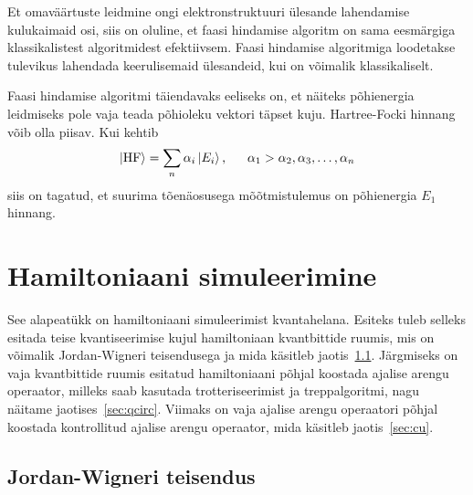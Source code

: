\documentclass[12pt]{report}
\def\ket#1{\left|#1\right>}
\begin{document}
Et omaväärtuste leidmine ongi elektronstruktuuri ülesande lahendamise kulukaimaid osi, siis on oluline, et faasi hindamise algoritm on sama eesmärgiga klassikalistest algoritmidest efektiivsem.
Faasi hindamise algoritmiga loodetakse tulevikus lahendada keerulisemaid ülesandeid, kui on võimalik klassikaliselt.

Faasi hindamise algoritmi täiendavaks eeliseks on, et näiteks põhienergia leidmiseks pole vaja teada põhioleku vektori täpset kuju.
Hartree-Focki hinnang võib olla piisav.
Kui kehtib
\begin{align}
    \ket{\text{HF}} = \sum_n \alpha_i \ket{E_i} \rlap{,}
    \qquad \alpha_1 > \alpha_2, \alpha_3, \ldots, \alpha_n
\end{align}
siis on tagatud, et suurima tõenäosusega mõõtmistulemus on põhienergia \(E_1\) hinnang.

\section{Hamiltoniaani simuleerimine}\label{sec:hamsim}

See alapeatükk on hamiltoniaani simuleerimist kvantahelana.
Esiteks tuleb selleks esitada teise kvantiseerimise kujul hamiltoniaan kvantbittide ruumis, mis on võimalik Jordan-Wigneri teisendusega ja mida käsitleb jaotis~\ref{sec:jw}.
Järgmiseks on vaja kvantbittide ruumis esitatud hamiltoniaani põhjal koostada ajalise arengu operaator, milleks saab kasutada trotteriseerimist ja treppalgoritmi, nagu näitame jaotises~\ref{sec:qcirc}.
Viimaks on vaja ajalise arengu operaatori põhjal koostada kontrollitud ajalise arengu operaator, mida käsitleb jaotis~\ref{sec:cu}.

\subsection{Jordan-Wigneri teisendus}\label{sec:jw}
\end{document}
